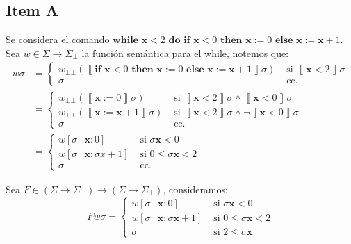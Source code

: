 \documentclass{article}
\newcommand{\sem}[1]{\left\llbracket #1\right\rrbracket}
\newcommand{\x}{\textbf{x}}
\newcommand{\cdom}{\Sigma \to \Sigma_\bot}
\newcommand{\bbot}{\bot\!\!\!\bot}
\newcommand{\cif}[3]{\textbf{if }#1\textbf{ then }#2\textbf{ else }#3}
\newcommand{\cwhile}[2]{\textbf{while }#1\textbf{ do }#2}
\begin{document}
\subsection*{Item A}
Se considera el comando $\cwhile{\x < 2}{\cif{\x < 0}{\x := 0}{\x := \x + 1}}$.
Sea $w \in \cdom$ la función semántica para el while, notemos que:
\begin{equation*}
  \begin{aligned}
    w \sigma &= \begin{cases}
      w_{\bbot} (\sem{\cif{\x<0}{\x:=0}{\x:=\x+1}}\sigma) &\text{ si }\sem{\x<2}\sigma \\ 
      \sigma &\text{ cc. }
    \end{cases} \\ 
             &= \begin{cases}
               w_{\bbot}(\sem{\x:=0}\sigma) &\text{ si }\sem{\x<2}\sigma \land \sem{\x<0}\sigma \\ 
               w_{\bbot}(\sem{\x:=\x+1}\sigma) &\text{ si }\sem{\x<2}\sigma \land \neg\sem{\x<0}\sigma \\ 
               \sigma &\text{ cc. }
             \end{cases} \\ 
             &= \begin{cases}
               w [\sigma\ |\ \x : 0] &\text{ si }\sigma \x < 0 \\ 
               w [\sigma\ |\ \x : \sigma x + 1] &\text{ si }0 \leq \sigma \x < 2 \\ 
               \sigma &\text{ cc. }
             \end{cases}
  \end{aligned}
\end{equation*}

Sea $F \in (\cdom) \to (\cdom)$, consideramos:
\begin{equation*}
  F w \sigma = \begin{cases}
    w [\sigma\ |\ \x : 0] &\text{ si }\sigma \x < 0 \\ 
    w [\sigma\ |\ \x : \sigma \x + 1] &\text{ si }0 \leq \sigma \x < 2 \\ 
    \sigma &\text{ si }2 \leq \sigma \x
  \end{cases}
\end{equation*}
\end{document}
